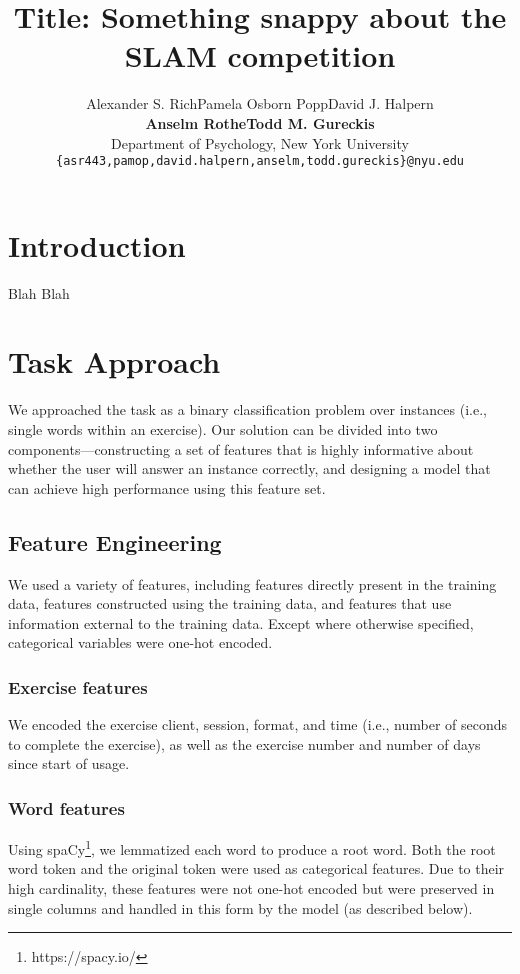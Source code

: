 \documentclass[11pt,a4paper]{article}
\title{Title: Something snappy about the SLAM competition}
\author{Alexander S. Rich\qquad Pamela Osborn Popp\qquad David J. Halpern\\
  \textbf{Anselm Rothe\qquad Todd M. Gureckis} \\
  Department of Psychology, New York University \\
  {\tt \{asr443,pamop,david.halpern,anselm,todd.gureckis\}@nyu.edu} \\}
\date{}
\begin{document}
\maketitle
\begin{abstract}
\end{abstract}

\section{Introduction}

Blah Blah \cite{slam18}

\section{Task Approach}

We approached the task as a binary classification problem over instances (i.e.,
single words within an exercise). Our solution can be divided into two
components---constructing a set of features that is highly informative about
whether the user will answer an instance correctly, and designing a model that
can achieve high performance using this feature set.

\subsection{Feature Engineering}

We used a variety of features, including features directly present in the
training data, features constructed using the training data, and features that
use information external to the training data. Except where otherwise specified,
categorical variables were one-hot encoded.

\subsubsection{Exercise features}

We encoded the exercise client, session, format, and time (i.e., number of
seconds to complete the exercise), as well as the exercise number and number of
days since start of usage.

\subsubsection{Word features}

Using spaCy\footnote{https://spacy.io/}, we lemmatized each word to produce a root word. Both the root
word token and the original token were used as categorical features. Due to
their high cardinality, these features were not one-hot encoded but were
preserved in single columns and handled in this form by the model (as described
below).
\end{document}
